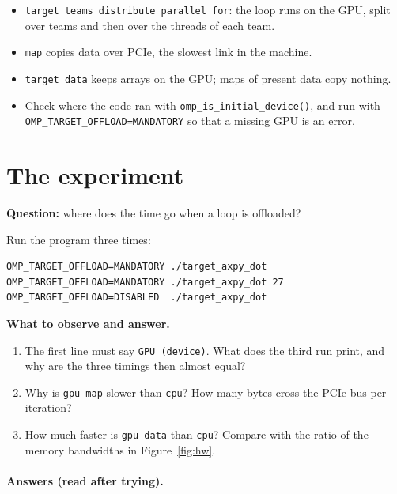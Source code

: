 \documentclass[11pt,a4paper]{article}
\let\origtexttt\texttt
\renewcommand{\texttt}[1]{\textcolor{black!60}{\origtexttt{#1}}}
\begin{document}
\begin{keyidea}
\begin{itemize}
  \item \texttt{target teams distribute parallel for}: the loop runs on the GPU, split over
        teams and then over the threads of each team.
  \item \texttt{map} copies data over PCIe, the slowest link in the machine.
  \item \texttt{target data} keeps arrays on the GPU; maps of present data copy nothing.
  \item Check where the code ran with \texttt{omp\_is\_initial\_device()}, and run with\\
        \texttt{OMP\_TARGET\_OFFLOAD=MANDATORY} so that a missing GPU is an error.
\end{itemize}
\end{keyidea}

\section{The experiment}
\begin{experiment}
\textbf{Question:} where does the time go when a loop is offloaded?

Run the program three times:
\begin{lstlisting}[style=sh]
OMP_TARGET_OFFLOAD=MANDATORY ./target_axpy_dot
OMP_TARGET_OFFLOAD=MANDATORY ./target_axpy_dot 27
OMP_TARGET_OFFLOAD=DISABLED  ./target_axpy_dot
\end{lstlisting}

\textbf{What to observe and answer.}
\begin{enumerate}
  \item The first line must say \texttt{GPU (device)}. What does the third run print, and
        why are the three timings then almost equal?
  \item Why is \texttt{gpu map} slower than \texttt{cpu}? How many bytes cross the PCIe bus
        per iteration?
  \item How much faster is \texttt{gpu data} than \texttt{cpu}? Compare with the ratio of the
        memory bandwidths in Figure~\ref{fig:hw}.
\end{enumerate}
\end{experiment}

\paragraph{Answers (read after trying).}
\end{document}
